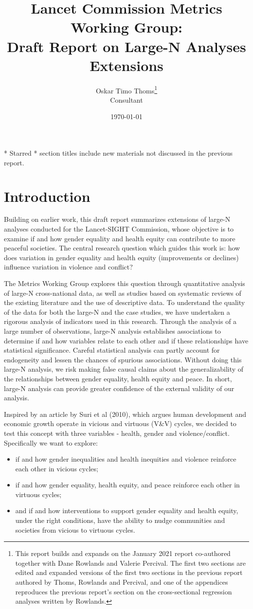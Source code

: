 \documentclass[12pt]{article}
\author{Oskar Timo Thoms\thanks{This report builds and expands on the January 2021 report co-authored together with Dane Rowlands and Valerie Percival. The first two sections are edited and expanded versions of the first two sections in the previous report authored by Thoms, Rowlands and Percival, and one of the appendices reproduces the previous report's section on the cross-sectional regression analyses written by Rowlands.}\\Consultant}
\title{Lancet Commission Metrics Working Group:\\Draft Report on Large-N Analyses Extensions}
\date{\today}
\begin{document}
\maketitle
\clearpage
\tableofcontents
\bigskip
\begin{center}
* Starred * section titles include new materials not discussed in the previous report.
\end{center}

\clearpage

\section{Introduction}
\label{intro}

Building on earlier work, this draft report summarizes extensions of large-N analyses conducted for the Lancet-SIGHT Commission, whose objective is to examine if and how gender equality and health equity can contribute to more peaceful societies.
The central research question which guides this work is: how does variation in gender equality and health equity (improvements or declines) influence variation in violence and conflict?

The Metrics Working Group explores this question through quantitative analysis of large-N cross-national data, as well as studies based on systematic reviews of the existing literature and the use of descriptive data. To understand the quality of the data for both the large-N and the case studies, we have undertaken a rigorous analysis of indicators used in this research.
Through the analysis of a large number of observations, large-N analysis establishes associations to determine if and how variables relate to each other and if these relationships have statistical significance. Careful statistical analysis can partly account for endogeneity and lessen the chances of spurious associations. Without doing this large-N analysis, we risk making false causal claims about the generalizability of the relationships between gender equality, health equity and peace. In short, large-N analysis can provide greater confidence of the external validity of our analysis.

Inspired by an article by Suri et al (2010), which argues human development and economic growth operate in vicious and virtuous (V\&V) cycles, we decided to test this concept with three variables - health, gender and violence/conflict. Specifically we want to explore:
\begin{itemize}
\item if and how gender inequalities and health inequities and violence reinforce each other in vicious cycles;
\item if and how gender equality, health equity, and peace reinforce each other in virtuous cycles;
\item and if and how interventions to support gender equality and health equity, under the right conditions, have the ability to nudge communities and societies from vicious to virtuous cycles.
\end{itemize}
\end{document}

